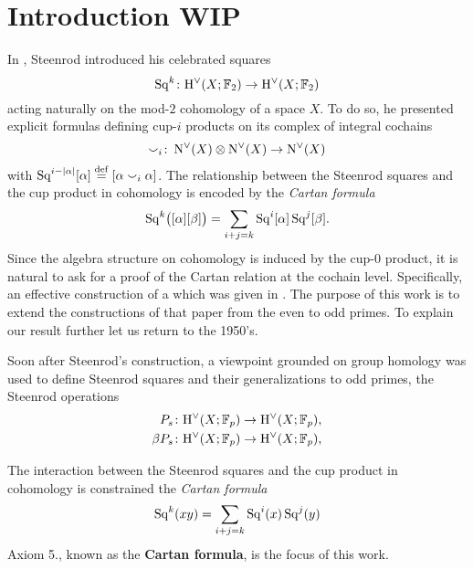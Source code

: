 
\section{Introduction WIP} \label{s:introduction}

In \cite{steenrod1947products}, Steenrod introduced his celebrated squares
\begin{equation*}
	\operatorname{Sq}^k \colon \mathrm{H}^\vee(X; {\mathbb{F}_2}) \to \mathrm{H}^\vee(X; {\mathbb{F}_2})
\end{equation*}
acting naturally on the mod-$2$ cohomology of a space $X$.
To do so, he presented explicit formulas defining cup-$i$ products on its complex of integral cochains
\[
\smallsmile_i \colon \operatorname{N^{\vee}}(X) \otimes \operatorname{N^{\vee}}(X) \to \operatorname{N^{\vee}}(X)
\]
with $\operatorname{Sq}^{i-\lvert\alpha\rvert}[\alpha] \stackrel{\mathrm{def}}{=} [\alpha \smallsmile_i \alpha]$.
The relationship between the Steenrod squares and the cup product in cohomology is encoded by the \textit{Cartan formula}
\[
\operatorname{Sq}^k\!\big([\alpha] [\beta]\big) = \sum_{i+j=k} \operatorname{Sq}^i [\alpha] \operatorname{Sq}^j[\beta].
\]
Since the algebra structure on cohomology is induced by the cup-$0$ product, it is natural to ask for a proof of the Cartan relation at the cochain level.
Specifically, an effective construction of a
which was given in \cite{medina2020cartan}.
The purpose of this work is to extend the constructions of that paper from the even to odd primes.
To explain our result further let us return to the 1950's.

Soon after Steenrod's construction, a viewpoint grounded on group homology was used to define Steenrod squares and their generalizations to odd primes, the Steenrod operations
\begin{align*}
	P_s \colon& \mathrm{H}^\vee(X; {\mathbb{F}_p}) \to \mathrm{H}^\vee(X; {\mathbb{F}_p}), \\
	\beta P_s \colon& \mathrm{H}^\vee(X; {\mathbb{F}_p}) \to \mathrm{H}^\vee(X; {\mathbb{F}_p}),
\end{align*}

The interaction between the Steenrod squares and the cup product in cohomology is constrained the \textit{Cartan formula}
\[
\operatorname{Sq}^k(x y) = \sum_{i+j=k} \operatorname{Sq}^i (x) \operatorname{Sq}^j(y)
\]
Axiom 5., known as the \textbf{Cartan formula}, is the focus of this work.

